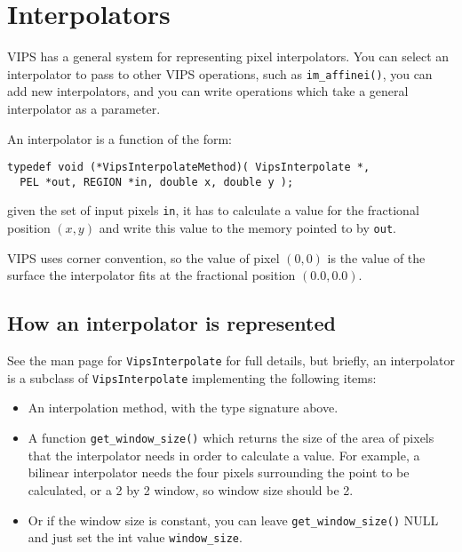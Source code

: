 \section{Interpolators}
\label{sec:interpolate}

VIPS has a general system for representing pixel interpolators. You can select
an interpolator to pass to other VIPS operations, such as \verb+im_affinei()+,
you can add new interpolators, and you can write operations which take a
general interpolator as a parameter. 

An interpolator is a function of the form:

\begin{verbatim}
typedef void (*VipsInterpolateMethod)( VipsInterpolate *,
  PEL *out, REGION *in, double x, double y );
\end{verbatim}

\noindent
given the set of input pixels \verb+in+, it has to calculate a value for the
fractional position $(x, y)$ and write this value to the memory pointed to by
\verb+out+.

VIPS uses corner convention, so the value of pixel $(0, 0)$ is the value of
the surface the interpolator fits at the fractional position $(0.0, 0.0)$.

\subsection{How an interpolator is represented}

See the man page for \verb+VipsInterpolate+ for full details, but briefly,
an interpolator is a subclass of \verb+VipsInterpolate+ implementing the 
following items:

\begin{itemize}
\item
An interpolation method, with the type signature above.

\item
A function \verb+get_window_size()+ which returns the size of the area of
pixels that the interpolator needs in order to calculate a value. For example,
a bilinear interpolator needs the four pixels surrounding the point to be
calculated, or a 2 by 2 window, so window size should be 2.

\item
Or if the window size is constant, you can leave \verb+get_window_size()+
NULL and just set the int value \verb+window_size+.

\end{itemize}

